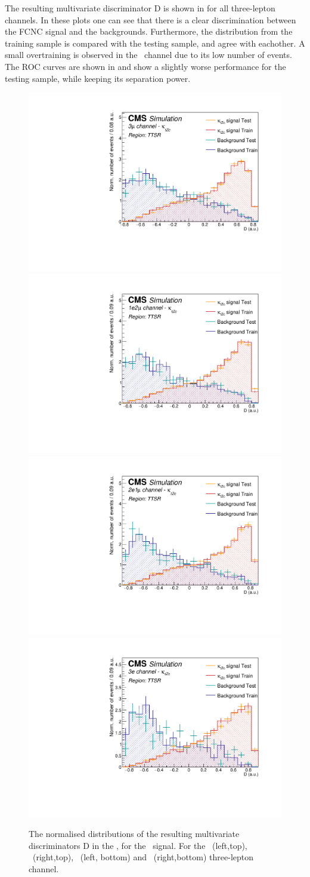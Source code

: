 \clearpage

The resulting multivariate discriminator D is shown in  for all three-lepton channels. In these plots one can see that there is a clear discrimination between the FCNC signal and the backgrounds. Furthermore, the distribution from the training sample is compared with the testing sample, and  agree with eachother. A small overtraining is observed in the \eee\ channel due to its low number of events. The ROC curves are shown in  and show a slightly worse performance for the testing sample, while keeping its separation power. 
\begin{figure}[htbp]
	\centering
	\includegraphics[width=0.49\linewidth]{6_Search/Figures/PlotsTechnics/SigVsBkgTestZcttoppairuuu}
	\includegraphics[width=0.49\linewidth]{6_Search/Figures/PlotsTechnics/SigVsBkgTestZcttoppairuue}
	\includegraphics[width=0.49\linewidth]{6_Search/Figures/PlotsTechnics/SigVsBkgTestZcttoppaireeu}
	\includegraphics[width=0.49\linewidth]{6_Search/Figures/PlotsTechnics/SigVsBkgTestZcttoppaireee}
	\caption{The normalised distributions of the resulting  multivariate discriminators D in the \TTSR, for the \Zct\ signal. For the \mumumu\ (left,top), \emumu\ (right,top), \eemu\ (left, bottom) and \eee\ (right,bottom) three-lepton channel.}
	\label{fig:sigvsbkgtestzcttoppaire}
\end{figure}

